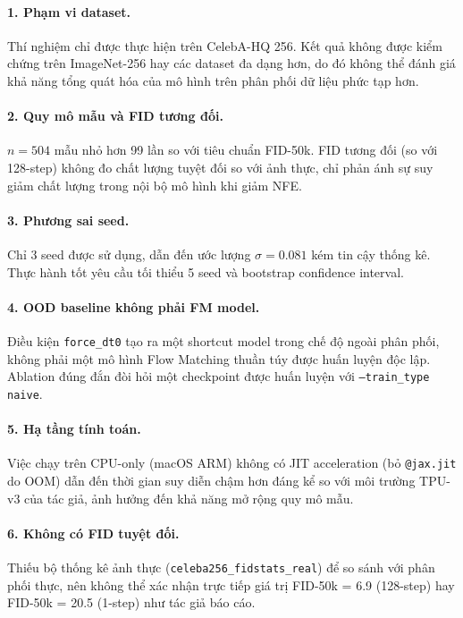 \paragraph{1. Phạm vi dataset.}
Thí nghiệm chỉ được thực hiện trên CelebA-HQ 256. Kết quả không được kiểm chứng trên ImageNet-256 hay các dataset đa dạng hơn, do đó không thể đánh giá khả năng tổng quát hóa của mô hình trên phân phối dữ liệu phức tạp hơn.

\paragraph{2. Quy mô mẫu và FID tương đối.}
$n = 504$ mẫu nhỏ hơn 99 lần so với tiêu chuẩn FID-50k. FID tương đối (so với 128-step) không đo chất lượng tuyệt đối so với ảnh thực, chỉ phản ánh sự suy giảm chất lượng trong nội bộ mô hình khi giảm NFE.

\paragraph{3. Phương sai seed.}
Chỉ 3 seed được sử dụng, dẫn đến ước lượng $\sigma = 0.081$ kém tin cậy thống kê. Thực hành tốt yêu cầu tối thiểu 5 seed và bootstrap confidence interval.

\paragraph{4. OOD baseline không phải FM model.}
Điều kiện \texttt{force\_dt0} tạo ra một shortcut model trong chế độ ngoài phân phối, không phải một mô hình Flow Matching thuần túy được huấn luyện độc lập. Ablation đúng đắn đòi hỏi một checkpoint được huấn luyện với \texttt{--train\_type naive}.

\paragraph{5. Hạ tầng tính toán.}
Việc chạy trên CPU-only (macOS ARM) không có JIT acceleration (bỏ \texttt{@jax.jit} do OOM) dẫn đến thời gian suy diễn chậm hơn đáng kể so với môi trường TPU-v3 của tác giả, ảnh hưởng đến khả năng mở rộng quy mô mẫu.

\paragraph{6. Không có FID tuyệt đối.}
Thiếu bộ thống kê ảnh thực (\texttt{celeba256\_fidstats\_real}) để so sánh với phân phối thực, nên không thể xác nhận trực tiếp giá trị FID-50k = 6.9 (128-step) hay FID-50k = 20.5 (1-step) như tác giả báo cáo.
